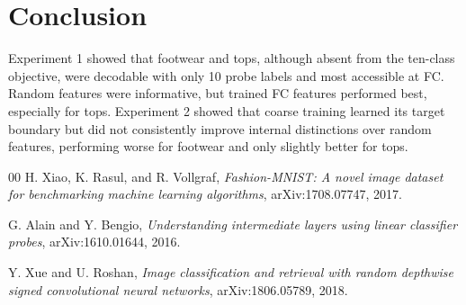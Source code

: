 \documentclass[conference]{IEEEtran}
\begin{document}
\section{Conclusion}

Experiment 1 showed that footwear and tops, although absent from the ten-class
objective, were decodable with only 10 probe labels and most accessible at FC.
Random features were informative, but trained FC features performed best,
especially for tops. Experiment 2 showed that coarse training learned its
target boundary but did not consistently improve internal distinctions over
random features, performing worse for footwear and only slightly better for
tops.

\begin{thebibliography}{00}
H. Xiao, K. Rasul, and R. Vollgraf, \emph{Fashion-MNIST: A novel image dataset
for benchmarking machine learning algorithms}, arXiv:1708.07747, 2017.

G. Alain and Y. Bengio, \emph{Understanding intermediate layers using linear
classifier probes}, arXiv:1610.01644, 2016.

Y. Xue and U. Roshan, \emph{Image classification and retrieval with random
depthwise signed convolutional neural networks}, arXiv:1806.05789, 2018.
\end{thebibliography}
\end{document}
